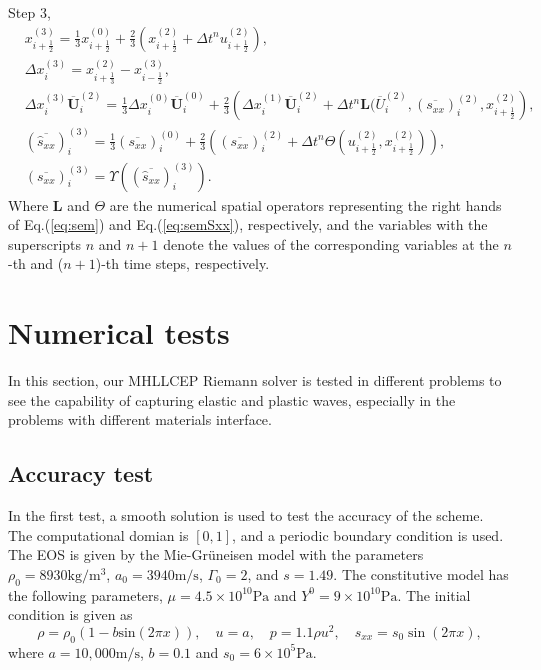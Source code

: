 \documentclass{article}
\numberwithin{equation}{section}
\numberwithin{table}{section}
\begin{document}
Step 3,
\begin{equation}
  \begin{aligned}
	& x_{i+\frac{1}{2}}^{(3)} = \frac{1}{3} x_{i+\frac{1}{2}}^{(0)}+\frac{2}{3} \left( x_{i+\frac{1}{2}}^{(2)}+\Delta t^n u_{i+\frac{1}{2}}^{(2)}\right),\\
	& \Delta x_i^{(3)} =  x_{i+\frac{1}{3}}^{(2)}- x_{i-\frac{1}{2}}^{(3)},\\
	& \Delta x_i^{(3)} \overline{\bm{U}}_i^{(2)}  = \frac{1}{3} \Delta x_i^{(0)} \overline{\bm{U}}_i^{(0)}+ \frac{2}{3} \left(  \Delta x_i^{(1)} \overline{\bm{U}}_i^{(2)} + \Delta t^n \bm{L}(\overline{U}_i^{(2)}, (\overline{s_{xx}})_i^{(2)}, x_{i+\frac{1}{2}}^{(2)} \right),\\
	& (\overline{\hat{s}_{xx}})_i^{(3)} =\frac{1}{3} (\overline{s_{xx}})_i^{(0)} + \frac{2}{3} \left(  (\overline{s_{xx}})_i^{(2)}+\Delta t^ n \varTheta (u_{i+\frac{1}{2}}^{(2)}, x_{i+\frac{1}{2}}^{(2)})\right),\\
  & (\overline{s_{xx}})_i^{(3)} = \Upsilon((\overline{\hat{s}_{xx}})_i^{(3)}).
\end{aligned}
\end{equation}
Where $\bm{L}$ and $\varTheta$ are the numerical spatial operators representing the right hands of Eq.(\ref{eq:sem}) and Eq.(\ref{eq:semSxx}), respectively, and the variables with the superscripts $n$ and $n+1$ denote the values of the corresponding variables at the $n$-th and ($n+1$)-th time steps, respectively.

\section{Numerical tests}
In this section, our MHLLCEP Riemann solver is tested  in different problems to see the capability of  capturing elastic and plastic waves, especially in the problems  with different materials interface.

\subsection{Accuracy test}
In the first test, a smooth solution is used to test the accuracy of the scheme. The computational domian is $[0,1]$, and a periodic boundary condition is used. The EOS is given by the Mie-Gr\"uneisen model with the parameters $\rho_0 = 8930 \text{kg}/\text{m}^3$, $a_0 = 3940 \text{m}/\text{s}$, $\Gamma_0 =2$, and $s=1.49$. The constitutive model has the following parameters, $\mu = 4.5\times 10^10 \text{Pa}$ and $Y^0 = 9\times 10^10 \text{Pa}$.  The initial condition  is  given as
\begin{equation}
  \rho = \rho_0(1-b \text{sin}(2\pi x)), \quad u = a, \quad p = 1.1\rho u^2, \quad  s_{xx} = s_0 \sin(2\pi x),
\end{equation}
where $a = 10,000\text{m}/\text{s}$, $ b = 0.1$  and  $s_0 = 6\times 10^5 \text{Pa}$.
\end{document}
